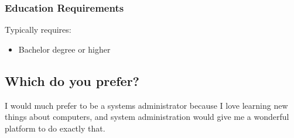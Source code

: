 \documentclass[11pt]{article}
\begin{document}
\subsubsection*{Education Requirements}
\label{sec:orgc555511}

Typically requires:
\begin{itemize}
\item Bachelor degree or higher
\end{itemize}

\subsection*{Which do you prefer?}
\label{sec:org889afd0}

I would much prefer to be a systems administrator because I love learning new things about computers, and system administration would give me a wonderful platform to do exactly that.

\nocite{monster}
\nocite{learnhowto}
\nocite{supportingadvancement}
{}

\end{document}
